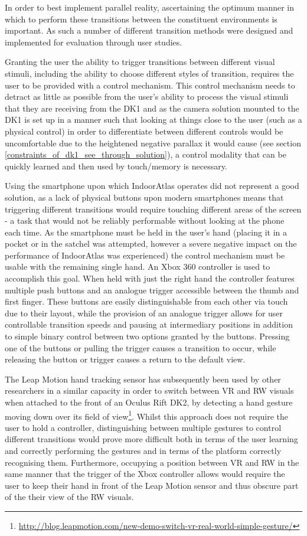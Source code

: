 In order to best implement parallel reality, ascertaining the optimum manner in which to perform these transitions between the constituent environments is important. As such a number of different transition methods were designed and implemented for evaluation through user studies.

Granting the user the ability to trigger transitions between different visual stimuli, including the ability to choose different styles of transition, requires the user to be provided with a control mechanism. This control mechanism needs to detract as little as possible from the user's ability to process the visual stimuli that they are receiving from the DK1 and as the camera solution mounted to the DK1 is set up in a manner such that looking at things close to the user (such as a physical control) in order to differentiate between different controls would be uncomfortable due to the heightened negative parallax it would cause (see section \ref{constraints_of_dk1_see_through_solution}), a control modality that can be quickly learned and then used by touch/memory is necessary.

Using the smartphone upon which IndoorAtlas operates did not represent a good solution, as a lack of physical buttons upon modern smartphones means that triggering different transitions would require touching different areas of the screen - a task that would not be reliably performable without looking at the phone each time. As the smartphone must be held in the user's hand (placing it in a pocket or in the satchel was attempted, however a severe negative impact on the performance of IndoorAtlas was experienced) the control mechanism must be usable with the remaining single hand. An Xbox 360 controller is used to accomplish this goal. When held with just the right hand the controller features multiple push buttons and an analogue trigger accessible between the thumb and first finger. These buttons are easily distinguishable from each other via touch due to their layout, while the provision of an analogue trigger allows for user controllable transition speeds and pausing at intermediary positions in addition to simple binary control between two options granted by the buttons. Pressing one of the buttons or pulling the trigger causes a transition to occur, while releasing the button or trigger causes a return to the default view.

The Leap Motion hand tracking sensor has subsequently been used by other researchers in a similar capacity in order to switch between VR and RW visuals when attached to the front of an Oculus Rift DK2, by detecting a hand gesture moving down over its field of view\footnote{\url{http://blog.leapmotion.com/new-demo-switch-vr-real-world-simple-gesture/}}. Whilst this approach does not require the user to hold a controller, distinguishing between multiple gestures to control different transitions would prove more difficult both in terms of the user learning and correctly performing the gestures and in terms of the platform correctly recognising them. Furthermore, occupying a position between VR and RW in the same manner that the trigger of the Xbox controller allows would require the user to keep their hand in front of the Leap Motion sensor and thus obscure part of the their view of the RW visuals.

